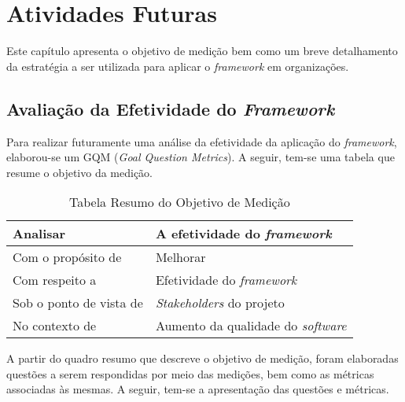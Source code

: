 \chapter{Atividades Futuras}

Este capítulo apresenta o objetivo de medição bem como um breve detalhamento da estratégia a ser utilizada para aplicar o \textit{framework} em organizações.

\section{Avaliação da Efetividade do \textit{Framework}}

Para realizar futuramente uma análise da efetividade da aplicação do \textit{framework}, elaborou-se um GQM (\textit{Goal Question Metrics}). A seguir, tem-se uma tabela que resume o objetivo da medição.

\begin{table}[h]
\centering
\begin{tabular}{ | m{8cm} | m{8cm} | } 
\hline
Analisar & A efetividade do \textit{framework} \\ 
\hline
Com o propósito de & Melhorar \\ 
\hline
Com respeito a & Efetividade do \textit{framework} \\ 
\hline
Sob o ponto de vista de & \textit{Stakeholders} do projeto \\ 
\hline
No contexto de & Aumento da qualidade do \textit{software} \\ 
\hline
\end{tabular}
\caption{Tabela Resumo do Objetivo de Medição}\label{table:1}
\end{table}

A partir do quadro resumo que descreve o objetivo de medição, foram elaboradas questões a serem respondidas por meio das medições, bem como as métricas associadas às mesmas. A seguir, tem-se a apresentação das questões e métricas.

